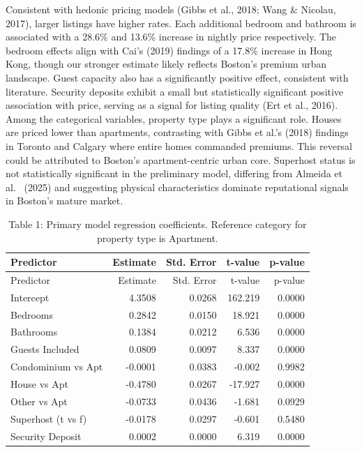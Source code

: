 \documentclass[
]{article}
\begin{document}
Consistent with hedonic pricing models (Gibbs et al., 2018; Wang \&
Nicolau, 2017), larger listings have higher rates. Each additional
bedroom and bathroom is associated with a 28.6\% and 13.6\% increase in
nightly price respectively. The bedroom effects align with Cai's (2019)
findings of a 17.8\% increase in Hong Kong, though our stronger estimate
likely reflects Boston's premium urban landscape. Guest capacity also
has a significantly positive effect, consistent with literature.
Security deposits exhibit a small but statistically significant positive
association with price, serving as a signal for listing quality (Ert et
al., 2016). Among the categorical variables, property type plays a
significant role. Houses are priced lower than apartments, contrasting
with Gibbs et al.'s (2018) findings in Toronto and Calgary where entire
homes commanded premiums. This reversal could be attributed to Boston's
apartment-centric urban core. Superhost status is not statistically
significant in the preliminary model, differing from Almeida et al.~
(2025) and suggesting physical characteristics dominate reputational
signals in Boston's mature market.

\begin{longtable}[]{@{}lrrrr@{}}
\caption{Table 1: Primary model regression coefficients. Reference
category for property type is Apartment.}\tabularnewline
\toprule\noalign{}
Predictor & Estimate & Std. Error & t-value & p-value \\
\midrule\noalign{}
\endfirsthead
\toprule\noalign{}
Predictor & Estimate & Std. Error & t-value & p-value \\
\midrule\noalign{}
\endhead
\bottomrule\noalign{}
\endlastfoot
Intercept & 4.3508 & 0.0268 & 162.219 & 0.0000 \\
Bedrooms & 0.2842 & 0.0150 & 18.921 & 0.0000 \\
Bathrooms & 0.1384 & 0.0212 & 6.536 & 0.0000 \\
Guests Included & 0.0809 & 0.0097 & 8.337 & 0.0000 \\
Condominium vs Apt & -0.0001 & 0.0383 & -0.002 & 0.9982 \\
House vs Apt & -0.4780 & 0.0267 & -17.927 & 0.0000 \\
Other vs Apt & -0.0733 & 0.0436 & -1.681 & 0.0929 \\
Superhost (t vs f) & -0.0178 & 0.0297 & -0.601 & 0.5480 \\
Security Deposit & 0.0002 & 0.0000 & 6.319 & 0.0000 \\
\end{longtable}
\end{document}
